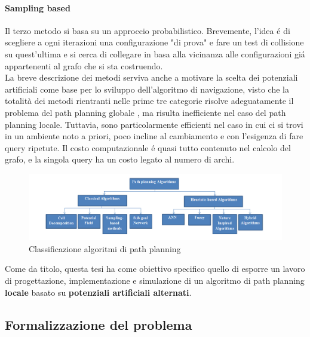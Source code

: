 \documentclass[14pt,a4paper]{extarticle}
\begin{document}
\paragraph{Sampling based} Il terzo metodo si basa su un approccio probabilistico. Brevemente, l'idea é di scegliere a ogni iterazioni una configurazione "di prova" e fare un test di collisione su quest'ultima e si cerca di collegare in basa alla vicinanza alle configurazioni giá appartenenti al grafo che si sta costruendo. \\


La breve descrizione dei metodi serviva anche a motivare la scelta dei potenziali artificiali come base per lo sviluppo dell'algoritmo di navigazione, visto che la totalità dei metodi rientranti nelle prime tre categorie risolve adeguatamente il problema del path planning globale \cite{dalfonso}, ma risulta inefficiente nel caso del path planning locale. Tuttavia, sono particolarmente efficienti nel caso in cui ci si trovi in un ambiente noto a priori, poco incline al cambiamento e con l'esigenza di fare query ripetute. Il costo computazionale é quasi tutto contenuto nel calcolo del grafo, e la singola query ha un costo legato al numero di archi.

\begin{figure}[H]
\caption{Classificazione algoritmi di path planning\cite{mac2016}}
\includegraphics[width=\textwidth]{algoritmiPP.png}
\end{figure}

Come da titolo, questa tesi ha come obiettivo specifico quello di esporre un lavoro di progettazione, implementazione e simulazione di un algoritmo di path planning \textbf{locale} basato su \textbf{potenziali artificiali alternati}. 

\subsection{Formalizzazione del problema}
\end{document}
